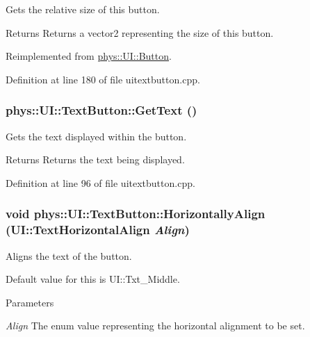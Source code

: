 Gets the relative size of this button. 

\begin{DoxyReturn}{Returns}
Returns a vector2 representing the size of this button. 
\end{DoxyReturn}


Reimplemented from \hyperlink{classphys_1_1UI_1_1Button_ade75e042d1a19be5d4fb1b16913af5a5}{phys::UI::Button}.



Definition at line 180 of file uitextbutton.cpp.

\hypertarget{classphys_1_1UI_1_1TextButton_a8dc28f2fa610dc9bb72e5886613996bd}{
\subsubsection[{GetText}]{ phys::UI::TextButton::GetText ()}}
\label{df/d03/classphys_1_1UI_1_1TextButton_a8dc28f2fa610dc9bb72e5886613996bd}


Gets the text displayed within the button. 

\begin{DoxyReturn}{Returns}
Returns the text being displayed. 
\end{DoxyReturn}


Definition at line 96 of file uitextbutton.cpp.

\hypertarget{classphys_1_1UI_1_1TextButton_a71a64810f262725992dbeec194e8497c}{
\subsubsection[{HorizontallyAlign}]{\setlength{\rightskip}{0pt plus 5cm}void phys::UI::TextButton::HorizontallyAlign (UI::TextHorizontalAlign {\em Align})}}
\label{df/d03/classphys_1_1UI_1_1TextButton_a71a64810f262725992dbeec194e8497c}


Aligns the text of the button. 

Default value for this is UI::Txt\_\-Middle. 
\begin{DoxyParams}{Parameters}
\item[{\em Align}]The enum value representing the horizontal alignment to be set. \end{DoxyParams}


